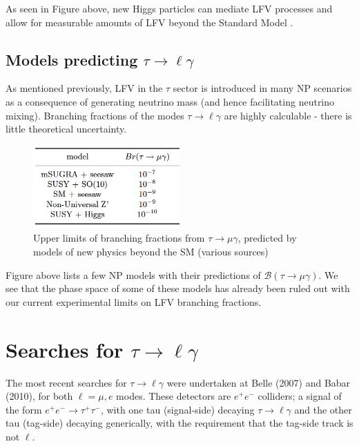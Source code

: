 \documentclass[12pt]{thesis}  %
\newcommand{\br}{\mathcal{B}}
\newcommand{\tmg}{\tau\to\mu\gamma}
\newcommand{\tlg}{\tau\to\ell\gamma}
\begin{document}
As seen in Figure above, new Higgs particles can mediate LFV processes and allow for measurable amounts of LFV beyond the Standard Model \cite{Dorsner:2015}.


\subsection{Models predicting $\tlg$}

As mentioned previously, LFV in the $\tau$ sector is introduced in many NP scenarios as a consequence of generating neutrino mass (and hence facilitating neutrino mixing). Branching fractions of the modes $\tlg$ are highly calculable - there is little theoretical uncertainty.

\begin{figure}[h]
\centering
\includegraphics[width=0.5\textwidth]{images/np-models-bounds.png}
\caption{Upper limits of branching fractions from $\tmg$, predicted by models of new physics beyond the SM (various sources)\cite{Ohshima:2007zz}}
\label{}
\end{figure}

Figure above lists a few NP models with their predictions of $\br(\tmg)$. We see that the phase space of some of these models has already been ruled out with our current experimental limits on LFV branching fractions.



\section{Searches for $\tlg$}

The most recent searches for $\tlg$ were undertaken at Belle (2007) and Babar (2010), for both $\ell=\mu,e$ modes. These detectors are $e^+ e^-$ colliders; a signal of the form $e^+ e^-\to \tau^+ \tau^-$, with one tau (signal-side) decaying $\tau\to \ell \gamma$ and the other tau (tag-side) decaying generically, with the requirement that the tag-side track is not $\ell$.
\end{document}
